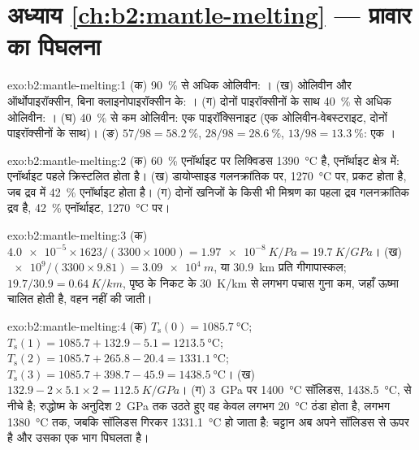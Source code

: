 \section*{अध्याय \ref{ch:b2:mantle-melting} --- प्रावार का पिघलना}

\begin{solution}{exo:b2:mantle-melting:1}
(क) \qty{90}{\percent} से अधिक ओलिवीन: । (ख) ओलिवीन और ऑर्थोपाइरॉक्सीन,
बिना क्लाइनोपाइरॉक्सीन के: । (ग) दोनों पाइरॉक्सीनों के साथ \qty{40}{\percent} से अधिक
ओलिवीन: । (घ) \qty{40}{\percent} से कम ओलिवीन: एक पाइरॉक्सिनाइट
(एक ओलिवीन-वेबस्टराइट, दोनों पाइरॉक्सीनों के साथ)। (ङ) $57/98 = \qty{58.2}{\percent}$,
$28/98 = \qty{28.6}{\percent}$, $13/98 = \qty{13.3}{\percent}$: एक ।
\end{solution}

\begin{solution}{exo:b2:mantle-melting:2}
(क) \qty{60}{\percent} एनॉर्थाइट पर लिक्विडस \qty{1390}{\celsius} है,
एनॉर्थाइट क्षेत्र में: एनॉर्थाइट पहले क्रिस्टलित होता है। (ख) डायोप्साइड
गलनक्रांतिक पर, \qty{1270}{\celsius} पर, प्रकट होता है, जब द्रव में \qty{42}{\percent} एनॉर्थाइट होता है।
(ग) दोनों खनिजों के किसी भी मिश्रण का पहला द्रव गलनक्रांतिक द्रव है,
\qty{42}{\percent} एनॉर्थाइट, \qty{1270}{\celsius} पर।
\end{solution}

\begin{solution}{exo:b2:mantle-melting:3}
(क) $\num{4.0e-5}\times1623/(3300\times1000) = \qty{1.97e-8}{K/Pa} =
\qty{19.7}{K/GPa}$। (ख) $\num{e9}/(3300\times9.81) = \qty{3.09e4}{m}$, या
\qty{30.9}{km} प्रति गीगापास्कल; $19.7/30.9 = \qty{0.64}{K/km}$, पृष्ठ के निकट के
\qty{30}{K/km} से लगभग पचास गुना कम, जहाँ ऊष्मा चालित होती है, वहन नहीं
की जाती।
\end{solution}

\begin{solution}{exo:b2:mantle-melting:4}
(क) $T_{\mathrm s}(0) = \qty{1085.7}{\celsius}$; $T_{\mathrm s}(1) = 1085.7 +
132.9 - 5.1 = \qty{1213.5}{\celsius}$; $T_{\mathrm s}(2) = 1085.7 + 265.8 - 20.4 =
\qty{1331.1}{\celsius}$; $T_{\mathrm s}(3) = 1085.7 + 398.7 - 45.9 =
\qty{1438.5}{\celsius}$। (ख) $132.9 - 2\times5.1\times2 = \qty{112.5}{K/GPa}$।
(ग) \qty{3}{GPa} पर \qty{1400}{\celsius} सॉलिडस,
\qty{1438.5}{\celsius}, से नीचे है; रुद्धोष्म के अनुदिश \qty{2}{GPa} तक उठते हुए वह केवल
लगभग \qty{20}{\celsius} ठंडा होता है, लगभग \qty{1380}{\celsius} तक, जबकि सॉलिडस गिरकर
\qty{1331.1}{\celsius} हो जाता है: चट्टान अब अपने सॉलिडस से ऊपर है और उसका एक भाग पिघलता है।
\end{solution}

